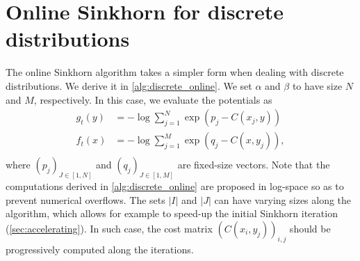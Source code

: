 

\section{Online Sinkhorn for discrete distributions}\label{sec:sinkhorn_discrete}

The online Sinkhorn algorithm takes a simpler form when dealing with discrete
distributions. We derive it in \autoref{alg:discrete_online}. We set $\alpha$
and $\beta$ to have size $N$ and $M$, respectively. In this case, we evaluate
the potentials as
\begin{align}
    g_t(y) &= - \log \sum_{j=1}^N \exp(p_j - C(x_j, y)) \\
    f_t(x) &= - \log \sum_{j=1}^M \exp(q_j - C(x, y_j)), \\
\end{align}
where $(p_j)_{J \in [1, N]}$ and $(q_j)_{J \in [1, M]}$ are fixed-size vectors.
Note that the computations derived in \autoref{alg:discrete_online} are proposed
in log-space so as to prevent numerical overflows. The sets $|I|$ and $|J|$ can
have varying sizes along the algorithm, which allows for example to speed-up the
initial Sinkhorn iteration (\autoref{sec:accelerating}). In such case, the
cost matrix $(C(x_i,y_j))_{i,j}$ should be progressively computed along the iterations.

